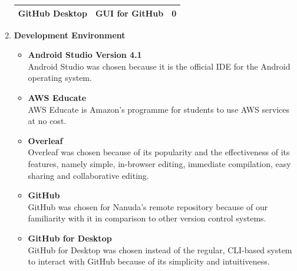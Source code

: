 \documentclass[conference]{IEEEtran}
\begin{document}
\begin{enumerate}
\begin{center}
\begin{tabular}{|p{6em}|p{10em}|p{4em}|}
                \hline
                GitHub Desktop & GUI for GitHub & 0 \\
                \hline
            \end{tabular}
        \end{center}
    \item \textbf{Development Environment}
    \begin{itemize}
        \item \textbf{Android Studio Version 4.1} \\
        Android Studio was chosen because it is the official IDE for the Android operating system.
        \item \textbf{AWS Educate} \\
        AWS Educate is Amazon's programme for students to use AWS services at no cost.
        \item \textbf{Overleaf} \\
        Overleaf was chosen because of its popularity and the effectiveness of its features, namely simple, in-browser editing, immediate compilation, easy sharing and collaborative editing.
        \item \textbf{GitHub} \\
        GitHub was chosen for Nanuda's remote repository because of our familiarity with it in comparison to other version control systems.
        \item \textbf{GitHub for Desktop} \\
        GitHub for Desktop was chosen instead of the regular, CLI-based system to interact with GitHub because of its simplicity and intuitiveness.
    \end{itemize}
\end{enumerate}
\end{document}
